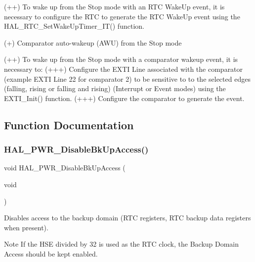 \begin{DoxyVerb}
      (++) To wake up from the Stop mode with an RTC WakeUp event, it is necessary to
           configure the RTC to generate the RTC WakeUp event using the HAL_RTC_SetWakeUpTimer_IT() function.

    (+) Comparator auto-wakeup (AWU) from the Stop mode

      (++) To wake up from the Stop mode with a comparator wakeup event, it is necessary to:
           (+++) Configure the EXTI Line associated with the comparator (example EXTI Line 22 for comparator 2) 
                 to be sensitive to to the selected edges (falling, rising or falling 
                 and rising) (Interrupt or Event modes) using the EXTI_Init() function.
           (+++) Configure the comparator to generate the event.      
\end{DoxyVerb}
 

\subsection{Function Documentation}
\mbox{\label{group___p_w_r___exported___functions___group2_ga1513de5f2e4b72e094fb04bab786fec8}} 
\subsubsection{\texorpdfstring{H\+A\+L\+\_\+\+P\+W\+R\+\_\+\+Disable\+Bk\+Up\+Access()}{HAL\_PWR\_DisableBkUpAccess()}}
{\footnotesize\ttfamily void H\+A\+L\+\_\+\+P\+W\+R\+\_\+\+Disable\+Bk\+Up\+Access (\begin{DoxyParamCaption}\item[{void}]{ }\end{DoxyParamCaption})}



Disables access to the backup domain (R\+TC registers, R\+TC backup data registers when present). 

\begin{DoxyNote}{Note}
If the H\+SE divided by 32 is used as the R\+TC clock, the Backup Domain Access should be kept enabled. 
\end{DoxyNote}

